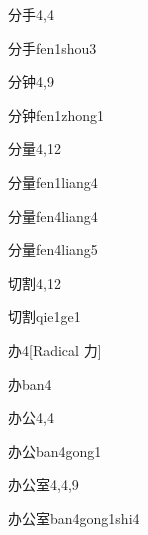\begin{entry}{分手}{4,4}
  \begin{phonetics}{分手}{fen1shou3}
  \end{phonetics}
\end{entry}

\begin{entry}{分钟}{4,9}
  \begin{phonetics}{分钟}{fen1zhong1}
  \end{phonetics}
\end{entry}

\begin{entry}{分量}{4,12}
  \begin{phonetics}{分量}{fen1liang4}
  \end{phonetics}
  \begin{phonetics}{分量}{fen4liang4}
  \end{phonetics}
  \begin{phonetics}{分量}{fen4liang5}
  \end{phonetics}
\end{entry}

\begin{entry}{切割}{4,12}
  \begin{phonetics}{切割}{qie1ge1}
  \end{phonetics}
\end{entry}

\begin{entry}{办}{4}[Radical 力]
  \begin{phonetics}{办}{ban4}
  \end{phonetics}
\end{entry}

\begin{entry}{办公}{4,4}
  \begin{phonetics}{办公}{ban4gong1}
  \end{phonetics}
\end{entry}

\begin{entry}{办公室}{4,4,9}
  \begin{phonetics}{办公室}{ban4gong1shi4}
  \end{phonetics}
\end{entry}

